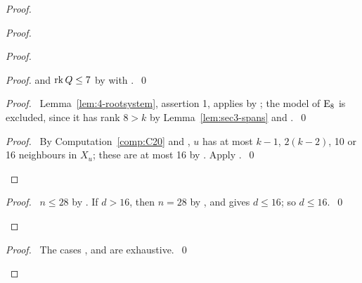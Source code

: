 \begin{proof}
\begin{proof}
\begin{proof}
\begin{proof}
    and $\mathop{\mathrm{rk}}\nolimits Q\le7$ by  with .~\qed\end{proof}
   \begin{proof}\pf\ Lemma~\ref{lem:4-rootsystem}, assertion 1, applies by ;
    the model of $\mathrm{E}_8$ is excluded, since it has rank $8>k$ by Lemma~\ref{lem:sec3-spans}
    and .~\qed\end{proof}
   \qedstep
   \begin{proof}\pf\ By Computation~\ref{comp:C20} and , $u$ has at most
    $k-1$, $2(k-2)$, 10 or 16 neighbours in $X_u$; these are at most 16 by .
    Apply .~\qed\end{proof}
  \end{proof}
  \qedstep
  \begin{proof}\pf\ $n\le28$ by . If $d>16$, then $n=28$ by , and
    gives $d\le16$; so $d\le16$.~\qed\end{proof}
 \end{proof}
 \qedstep
 \begin{proof}\pf\ The cases ,  and  are
  exhaustive.~\qed\end{proof}
\end{proof}

